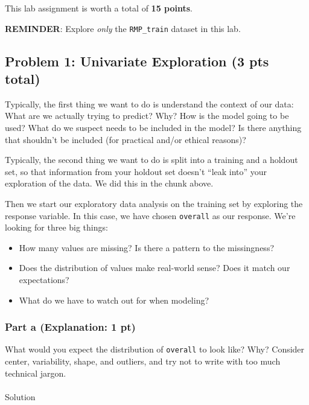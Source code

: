 \documentclass[
  letterpaper,
  DIV=11,
  numbers=noendperiod]{scrartcl}
\makeatletter
\let\oldparagraph\paragraph
\renewcommand{\paragraph}{
    \@ifstar
      \xxxParagraphStar
      \xxxParagraphNoStar
  }
\newcommand{\xxxParagraphStar}[1]{\oldparagraph*{#1}\mbox{}}
\newcommand{\xxxParagraphNoStar}[1]{\oldparagraph{#1}\mbox{}}
\providecommand{\tightlist}{%
  \setlength{\itemsep}{0pt}\setlength{\parskip}{0pt}}
\makeatother
\begin{document}
This lab assignment is worth a total of \textbf{15 points}.

\textbf{REMINDER}: Explore \emph{only} the \texttt{RMP\_train} dataset
in this lab.

\subsection{Problem 1: Univariate Exploration (3 pts
total)}\label{problem-1-univariate-exploration-3-pts-total}

Typically, the first thing we want to do is understand the context of
our data: What are we actually trying to predict? Why? How is the model
going to be used? What do we suspect needs to be included in the model?
Is there anything that shouldn't be included (for practical and/or
ethical reasons)?

Typically, the second thing we want to do is split into a training and a
holdout set, so that information from your holdout set doesn't ``leak
into'' your exploration of the data. We did this in the chunk above.

Then we start our exploratory data analysis on the training set by
exploring the response variable. In this case, we have chosen
\texttt{overall} as our response. We're looking for three big things:

\begin{itemize}
\tightlist
\item
  How many values are missing? Is there a pattern to the missingness?
\item
  Does the distribution of values make real-world sense? Does it match
  our expectations?
\item
  What do we have to watch out for when modeling?
\end{itemize}

\subsubsection{Part a (Explanation: 1
pt)}\label{part-a-explanation-1-pt}

What would you expect the distribution of \texttt{overall} to look like?
Why? Consider center, variability, shape, and outliers, and try not to
write with too much technical jargon.

\paragraph{Solution}\label{solution}
\end{document}
